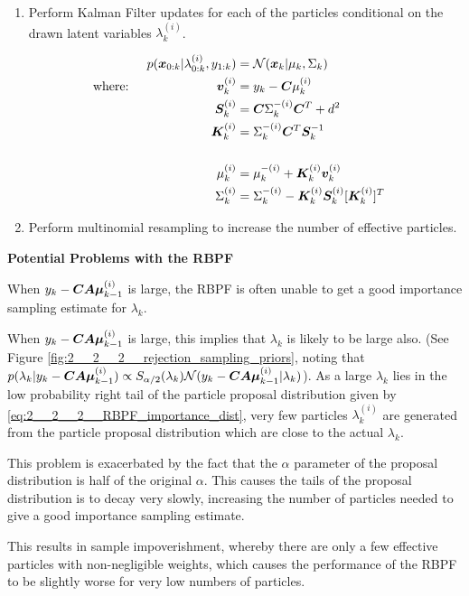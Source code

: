 \documentclass[../main.tex]{subfiles}
\begin{document}
\begin{enumerate}
	\item Perform Kalman Filter updates for each of the particles conditional on the drawn latent variables $\lambda_k^{(i)}$.
	
	\begin{align}
		& & p(\bm{x}_{0:k} | \lambda_{0:k}^{(i)}, y_{1:k}) &= \mathcal{N}(\bm{x}_k | \mu_k, \Sigma_k) &&\\
		& \text{where: } & \bm{v}_k^{(i)} &= y_k - \bm{C}\mu_k^{(i)}&& \notag\\
		&& \bm{S}_k^{(i)} &= \bm{C}\Sigma_k^{-(i)}\bm{C}^T + d^2&& \notag\\    
		&& \bm{K}_k^{(i)} &= \Sigma_k^{-(i)}\bm{C}^T \bm{S}_k^{-1}&&\notag\\ 
		\notag\\
		&& \mu_k^{(i)} &= \mu_k^{-(i)} + \bm{K}_k^{(i)} \bm{v}_k^{(i)}&& \notag\\
		&&\Sigma_k^{(i)} &= \Sigma_k^{-(i)} - \bm{K}_k^{(i)}\bm{S}_k^{(i)} [\bm{K}_k^{(i)}]^T&& \notag
	\end{align}
	
	
	\item Perform multinomial resampling to increase the number of effective particles.
	
\end{enumerate}

\textbf{Potential Problems with the RBPF}

When $y_k - \bm{CA\mu}_{k-1}^{(i)}$ is large, the RBPF is often unable to get a good importance sampling estimate for $\lambda_k$.

When $y_k - \bm{CA\mu}_{k-1}^{(i)}$ is large, this implies that $\lambda_k$ is likely to be large also. (See Figure \ref{fig:2__2__2__rejection_sampling_priors}, noting that $p(\lambda_k | y_k - \bm{CA\mu}_{k-1}^{(i)}) \propto S_{\alpha/2}(\lambda_k)\mathcal{N}(y_k - \bm{CA\mu}_{k-1}^{(i)} | \lambda_k)$). As a large $\lambda_k$ lies in the low probability right tail of the particle proposal distribution given by \autoref{eq:2__2__2__RBPF_importance_dist}, very few particles $\lambda_k^{(i)}$ are generated from the particle proposal distribution which are close to the actual $\lambda_k$. 

This problem is exacerbated by the fact that the $\alpha$ parameter of the proposal distribution is half of the original $\alpha$. This causes the tails of the proposal distribution is to decay very slowly, increasing the number of particles needed to give a good importance sampling estimate. 

This results in sample impoverishment, whereby there are only a few effective particles with non-negligible weights, which causes the performance of the RBPF to be slightly worse for very low numbers of particles. 
\end{document}

